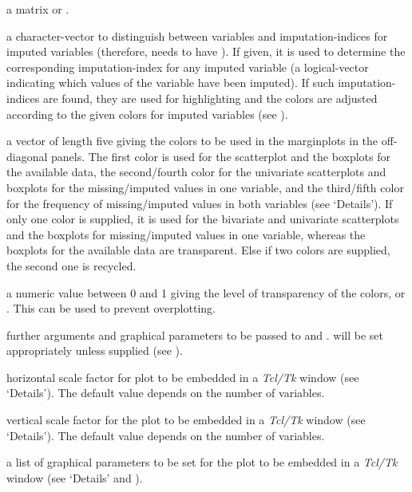 \begin{Arguments}
\begin{ldescription}
\item[\code{x}] a matrix or .
\item[\code{delimiter}] a character-vector to distinguish between variables
and imputation-indices for imputed variables (therefore,  needs
to have ). If given, it is used to determine the corresponding
imputation-index for any imputed variable (a logical-vector indicating
which values of the variable have been imputed). If such imputation-indices
are found, they are used for highlighting and the colors are adjusted 
according to the given colors for imputed variables (see ).
\item[\code{col}] a vector of length five giving the colors to be used in the 
marginplots in the off-diagonal panels.  The first color is used for 
the scatterplot and the boxplots for the available data, the second/fourth 
color for the univariate scatterplots and boxplots for the missing/imputed 
values in one variable, and the third/fifth color for the frequency of 
missing/imputed values in both variables (see `Details').  If only 
one color is supplied, it is used for the bivariate and univariate 
scatterplots and the boxplots for missing/imputed values in one variable, 
whereas the boxplots for the available data are transparent.  Else 
if two colors are supplied, the second one is recycled.
\item[\code{alpha}] a numeric value between 0 and 1 giving the level of 
transparency of the colors, or .  This can be used to
prevent overplotting.
\item[\code{...}] further arguments and graphical parameters to be 
passed to  and .  
 will be set appropriately unless supplied 
(see ).
\item[\code{hscale}] horizontal scale factor for plot to be embedded in a 
\emph{Tcl/Tk} window (see `Details').  The default value 
depends on the number of variables.
\item[\code{vscale}] vertical scale factor for the plot to be embedded in a 
\emph{Tcl/Tk} window (see `Details').  The default value 
depends on the number of variables.
\item[\code{TKRpar}] a list of graphical parameters to be set for the plot 
to be embedded in a \emph{Tcl/Tk} window (see `Details' and 
).
\end{ldescription}
\end{Arguments}
